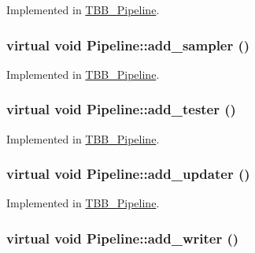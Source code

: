 Implemented in \hyperlink{class_t_b_b___pipeline_a80c9dfeac28acbbfd58bb74667aed6c0}{TBB\_\-Pipeline}.

\hypertarget{class_pipeline_aa1bdee70f85f452a2f68c67313d8b2d0}{
\subsubsection[{add\_\-sampler}]{\setlength{\rightskip}{0pt plus 5cm}virtual void Pipeline::add\_\-sampler ()}}
\label{class_pipeline_aa1bdee70f85f452a2f68c67313d8b2d0}


Implemented in \hyperlink{class_t_b_b___pipeline_a366b2c3a7c457132fdf1e37e4176cc2a}{TBB\_\-Pipeline}.

\hypertarget{class_pipeline_afbc6eaee843ebceca849ed9a5078bd9c}{
\subsubsection[{add\_\-tester}]{\setlength{\rightskip}{0pt plus 5cm}virtual void Pipeline::add\_\-tester ()}}
\label{class_pipeline_afbc6eaee843ebceca849ed9a5078bd9c}


Implemented in \hyperlink{class_t_b_b___pipeline_a08d85d063aa95ccc7ff3b637ca626376}{TBB\_\-Pipeline}.

\hypertarget{class_pipeline_a60f948a86dd41079ea887a77a0a3614e}{
\subsubsection[{add\_\-updater}]{\setlength{\rightskip}{0pt plus 5cm}virtual void Pipeline::add\_\-updater ()}}
\label{class_pipeline_a60f948a86dd41079ea887a77a0a3614e}


Implemented in \hyperlink{class_t_b_b___pipeline_a510fca80eb5804ab4a3fd102e008b166}{TBB\_\-Pipeline}.

\hypertarget{class_pipeline_a0dc7f98daffefe534ff469ab3c8336b9}{
\subsubsection[{add\_\-writer}]{\setlength{\rightskip}{0pt plus 5cm}virtual void Pipeline::add\_\-writer ()}}
\label{class_pipeline_a0dc7f98daffefe534ff469ab3c8336b9}


